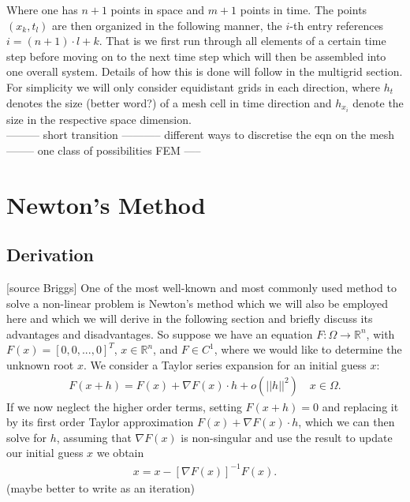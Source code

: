 \documentclass[../draft_1.tex]{subfiles}
\begin{document}
Where one has $n+1$ points in space and $m+1$ points in time. The points $(x_k, t_l)$ are then organized in the following manner, the $i$-th entry references $i = (n+1) \cdot l + k$. That is we first run through all elements of a certain time step before moving on to the next time step which will then be assembled into one overall system. Details of how this is done will follow in the multigrid section. For simplicity we will only consider equidistant grids in each direction, where $h_t$ denotes the size (better word?) of a mesh cell in time direction and $h_{x_i}$ denote the size in the respective space dimension. 
\bigskip
\\
--------- short transition ----------- different ways to discretise the eqn on the mesh -------- one class of possibilities FEM -----

\section{Newton's Method}
\subsection{Derivation}
[source Briggs] One of the most well-known and most commonly used method to solve a non-linear problem is Newton's method which we will also be employed here and which we will derive in the following section and briefly discuss its advantages and disadvantages. So suppose we have an equation
$F : \Omega \rightarrow \mathbb{R}^n$, with $F(x) = [0, 0, ..., 0]^T$, $x \in \mathbb{R}^n$, and $F \in C^1$, where we would like to determine the unknown root $x$. We consider a Taylor series expansion for an initial guess $x$:
\begin{equation}
\begin{aligned}
F(x + h) = F(x) + \nabla F(x) \cdot h + o(||h||^2) \quad x \in \Omega.
\end{aligned}
\end{equation}
If we now neglect the higher order terms, setting $F(x+h) = 0$ and replacing it by its first order Taylor approximation $F(x) + \nabla F(x) \cdot h$, which we can then solve for $h$, assuming that $\nabla F(x)$ is non-singular and use the result to update our initial guess $x$ we obtain 
\begin{equation}
\begin{aligned}
x = x - [\nabla F(x)]^{-1} F(x). 
\end{aligned}
\end{equation}
(maybe better to write as an iteration)
\end{document}
